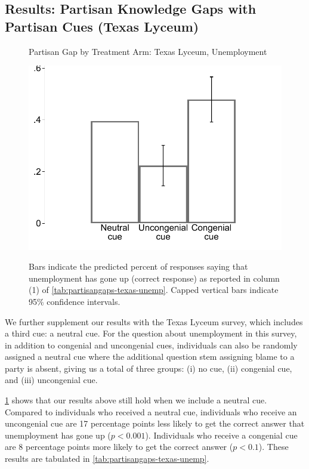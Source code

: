 \documentclass[12pt, letterpaper]{article}
\begin{document}
\subsection*{Results: Partisan Knowledge Gaps with Partisan Cues (Texas Lyceum)}
\begin{figure}[!t]
	\centering
	\caption{Partisan Gap by Treatment Arm: Texas Lyceum, Unemployment}
	\includegraphics[width=.55\textwidth]{../figs/texas-unemp-congenialcue.pdf}
	\label{fig:partisangaps-texas-unemp}
	\caption*{\footnotesize 
		Bars indicate the predicted percent of responses saying that unemployment has gone up (correct response) as reported in column (1) of \cref{tab:partisangaps-texas-unemp}.  
		Capped vertical bars indicate 95\% confidence intervals.
	}
\end{figure}

We further supplement our results with the Texas Lyceum survey, which includes a third cue: a neutral cue. For the question about unemployment in this survey, in addition to congenial and uncongenial cues, individuals can also be randomly assigned a neutral cue where the additional question stem assigning blame to a party is absent, giving us a total of three groups: (i) no cue, (ii) congenial cue, and (iii) uncongenial cue.

\cref{fig:partisangaps-texas-unemp} shows that our results above still hold when we include a neutral cue. Compared to individuals who received a neutral cue, individuals who receive an uncongenial cue are 17 percentage points less likely to get the correct answer that unemployment has gone up ($p<0.001$). Individuals who receive a congenial cue are 8 percentage points more likely to get the correct answer ($p<0.1$). These results are tabulated in \cref{tab:partisangaps-texas-unemp}.
\end{document}
